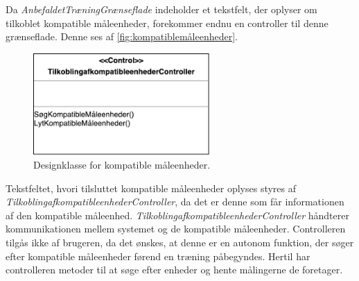 Da \textit{AnbefaldetTræningGrænseflade} indeholder et tekstfelt, der oplyser om tilkoblet kompatible måleenheder, forekommer endnu en controller til denne grænseflade. Denne ses af \autoref{fig:kompatiblemåleenheder}.

\begin{figure} [H]
\centering
\includegraphics[width=0.6\textwidth]{figures/MVC/MVCKompMaale}
\caption{Designklasse for kompatible måleenheder.}
\label{fig:kompatiblemåleenheder}
\end{figure}

\noindent
Tekstfeltet, hvori tilsluttet kompatible måleenheder oplyses styres af \textit{TilkoblingafkompatibleenhederController}, da det er denne som får informationen af den kompatible måleenhed.
\textit{TilkoblingafkompatibleenhederController} håndterer kommunikationen mellem systemet og de kompatible måleenheder. Controlleren tilgås ikke af brugeren, da det ønskes, at denne er en autonom funktion, der søger efter kompatible måleenheder førend en træning påbegyndes. Hertil har controlleren metoder til at søge efter enheder og hente målingerne de foretager.

